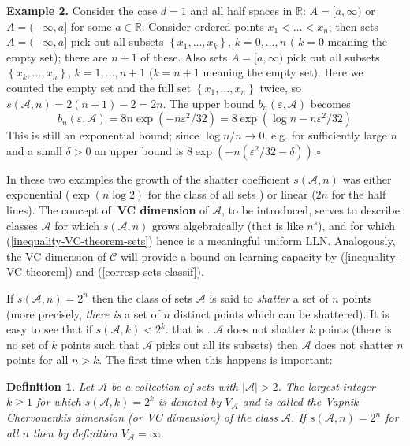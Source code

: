 \documentclass[11pt,twoside]{article}%
\theoremstyle{change}
\newtheorem{definition}[theorem]{Definition}
\begin{document}
\textbf{Example 2. }Consider the case $d=1$ and all half spaces in
$\mathbb{R}$: $A=[a,\infty)$ or $A=(-\infty,a]$ for some $a\in\mathbb{R}$.
Consider ordered points $x_{1}<\ldots<x_{n}$; then sets $A=(-\infty,a]$ pick
out all subsets $\left\{  x_{1},\ldots,x_{k}\right\}  $, $k=0,\ldots,n$ (
$k=0$ meaning the empty set); there are $n+1$ of these. Also sets
$A=[a,\infty)$ pick out all subsets $\left\{  x_{k},\ldots,x_{n}\right\}  $,
$k=1,\ldots,n+1 $ ($k=n+1$ meaning the empty set). Here we counted the empty
set and the full set $\left\{  x_{1},\ldots,x_{n}\right\}  $ twice, so
$s\left(  \mathcal{A},n\right)  =2\left(  n+1\right)  -2=2n.$ The upper bound
$b_{n}(\varepsilon,\mathcal{A})$ becomes
\[
b_{n}(\varepsilon,\mathcal{A})=8n\exp\left(  -n\varepsilon^{2}/32\right)
=8\exp\left(  \log n-n\varepsilon^{2}/32\right)
\]
This is still an exponential bound; since $\log n/n\rightarrow0$, e.g. for
sufficiently large $n$ and a small $\delta>0$ an upper bound is $8\exp\left(
-n\left(  \varepsilon^{2}/32-\delta\right)  \right)  .\square$\bigskip\bigskip

In these two examples the growth of the shatter coefficient $s\left(
\mathcal{A},n\right)  $ was either exponential ($\exp(n\log2)$ for the class
of all sets ) or linear ($2n$ for the half lines). The concept of\textbf{\ VC
dimension} of $\mathcal{A}$, to be introduced, serves to describe classes
$\mathcal{A}$ for which $s\left(  \mathcal{A},n\right)  $ grows algebraically
(that is like $n^{s}$), and for which (\ref{inequality-VC-theorem-sets}) hence
is a meaningful uniform LLN. Analogously, the VC dimension of $\mathcal{C}$
will provide a bound on learning capacity by (\ref{inequality-VC-theorem}) and
(\ref{corresp-sets-classif}).

If $s\left(  \mathcal{A},n\right)  =2^{n}$ then the class of sets
$\mathcal{A}$ is said to \textit{shatter} a set of $n$ points (more precisely,
\textit{there is }a set of $n$ distinct points which can be shattered). It is
easy to see that if $s\left(  \mathcal{A},k\right)  <2^{k}$. that is .
$\mathcal{A} $ does not shatter $k$ points (there is no set of $k$ points such
that $\mathcal{A}$ picks out all its subsets) then $\mathcal{A}$ does not
shatter $n$ points for all $n>k.$ The first time when this happens is important:

\begin{definition}
Let $\mathcal{A}$ be a collection of sets with $\left\vert \mathcal{A}%
\right\vert >2$. The largest integer $k\geq1$ for which $s\left(
\mathcal{A},k\right)  =2^{k}$ is denoted by $V_{\mathcal{A}}$ and is called
the Vapnik-Chervonenkis dimension (or VC dimension) of the class $\mathcal{A}%
$. If $s\left(  \mathcal{A},n\right)  =2^{n}$ for all $n$ then by definition
$V_{\mathcal{A}}=\infty$.
\end{definition}
\end{document}
